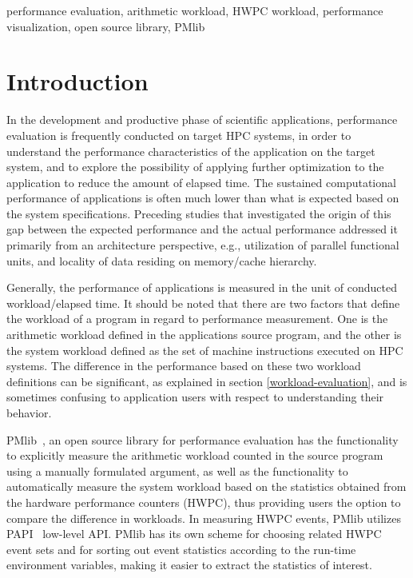\documentclass[conference]{IEEEtran}
\begin{document}
\begin{IEEEkeywords}
performance evaluation,
arithmetic workload,
HWPC workload,
performance visualization,
open source library,
PMlib
\end{IEEEkeywords}

\section{Introduction}
In the development and productive phase of scientific applications,
performance evaluation is frequently conducted on target HPC systems,
in order to understand the performance characteristics
of the application on the target system, and to explore the possibility of
applying further optimization to the application to reduce the amount of
elapsed time.
The sustained computational performance of applications is often much
lower than what is expected based on the system specifications.
Preceding studies that investigated the origin of this gap between
the expected performance and the actual performance addressed it
primarily from an architecture perspective, e.g., 
utilization of parallel functional units,
and locality of data residing on memory/cache hierarchy.

Generally, the performance of applications is measured in the unit of
conducted workload/elapsed time.
It should be noted that there are two factors that define the workload
of a program in regard to performance measurement. 
One is the arithmetic workload defined in the applications source program,
and the other is the system workload defined as the set of
machine instructions executed on HPC systems.
The difference in the performance based on these two workload definitions
can be significant, as explained in section \ref{workload-evaluation},
and is sometimes confusing to application users with respect to
understanding their behavior.

PMlib~\cite{PMlib:webpage-public}, an open source library for performance
evaluation has the functionality
to explicitly measure the arithmetic workload counted in the source program
using a manually formulated argument, as well as the functionality
to automatically measure the system workload based on the statistics
obtained from the hardware performance counters (HWPC),
thus providing users the option to compare the difference in workloads.
In measuring HWPC events, PMlib utilizes PAPI~\cite{PAPI:5.6} low-level API.
PMlib has its own scheme for choosing related HWPC event sets and for sorting
out event statistics according to the run-time environment variables, making it
easier to extract the statistics of interest.
\end{document}

